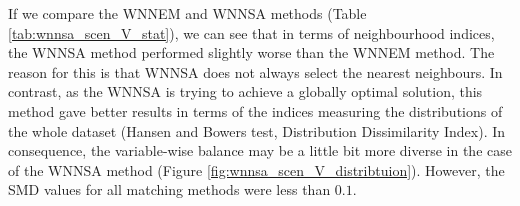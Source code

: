 		\begin{table}[h]
			\caption{Quality measures for Scenario V. %
			}
			\label{tab:wnnsa_scen_V_stat}
			\centering
		\end{table}
										
		If we compare the WNNEM and WNNSA methods (Table \ref{tab:wnnsa_scen_V_stat}), we can see that in terms of neighbourhood indices, the WNNSA method performed slightly worse than the WNNEM method. The reason for this is that WNNSA does not always select the nearest neighbours. In contrast, as the WNNSA is trying to achieve a globally optimal solution, this method gave better results in terms of the indices measuring the distributions of the whole dataset (Hansen and Bowers test, Distribution Dissimilarity Index). In consequence, the variable-wise balance may be a little bit more diverse in the case of the WNNSA method (Figure \ref{fig:wnnsa_scen_V_distribtuion}). However, the SMD values for all matching methods were less than $0.1$.
				
